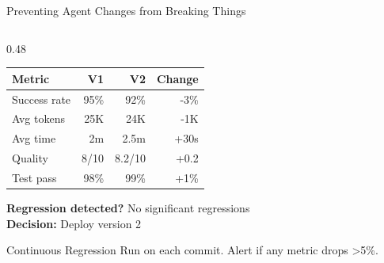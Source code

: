 \documentclass[aspectratio=169,11pt]{beamer}
\begin{document}
\begin{frame}[fragile]{Preventing Agent Changes from Breaking Things}
\begin{columns}[T]
\begin{column}{0.48\textwidth}
            \begin{tabular}{lrrr}
                \toprule
                Metric & V1 & V2 & Change\\
                \midrule
                Success rate & 95\% & 92\% & -3\%\\
                Avg tokens & 25K & 24K & -1K\\
                Avg time & 2m & 2.5m & +30s\\
                Quality & 8/10 & 8.2/10 & +0.2\\
                Test pass & 98\% & 99\% & +1\%\\
                \bottomrule
            \end{tabular}

            \textbf{Regression detected?} No significant regressions\\
            \textbf{Decision:} Deploy version 2

            \begin{block}{Continuous Regression}
                Run on each commit. Alert if any metric drops >5\%.
            \end{block}
        \end{column}
    \end{columns}
\end{frame}
\end{document}
